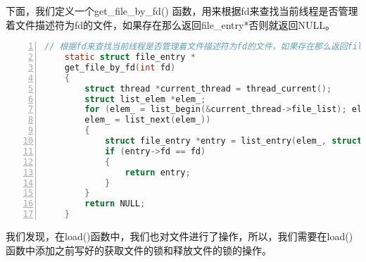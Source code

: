 \documentclass{article}
\begin{document}
	下面，我们定义一个get\_file\_by\_fd() 函数，用来根据fd来查找当前线程是否管理着文件描述符为fd的文件，如果存在那么返回file\_entry*否则就返回NULL。
	
	\begin{lstlisting}[xleftmargin = 4em,xrightmargin = 4em, aboveskip = 1em, numbers = left, language = C,title=src/userprog/syscall.c - get\_file\_by\_fd()]
    // 根据fd来查找当前线程是否管理着文件描述符为fd的文件，如果存在那么返回file_entry*否则就返回NULL
    static struct file_entry *
    get_file_by_fd(int fd)
    {
        struct thread *current_thread = thread_current();
        struct list_elem *elem_;
        for (elem_ = list_begin(&current_thread->file_list); elem_ != list_end(&current_thread->file_list);
        elem_ = list_next(elem_))
        {
            struct file_entry *entry = list_entry(elem_, struct file_entry, elem);
            if (entry->fd == fd)
            {
                return entry;
            }
        }
        return NULL;
    }
	\end{lstlisting}
	
	我们发现，在load()函数中，我们也对文件进行了操作，所以，我们需要在load()函数中添加之前写好的获取文件的锁和释放文件的锁的操作。
	
\end{document}
